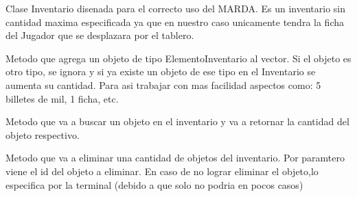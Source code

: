 \documentclass[letterpaper,10pt,english]{sphinxmanual}
\begin{document}
\begin{fulllineitems}
\label{\detokenize{codigo:inventario.Inventario}}
Clase Inventario disenada para el correcto uso del MARDA. Es un inventario sin cantidad maxima
especificada ya que en nuestro caso unicamente tendra la ficha del Jugador que se desplazara por
el tablero.

\begin{fulllineitems}
\label{\detokenize{codigo:inventario.Inventario.agregar}}
Metodo que agrega un objeto de tipo ElementoInventario al vector. Si el objeto es otro tipo, se ignora y
si ya existe un objeto de ese tipo en el Inventario se aumenta su cantidad. Para asi trabajar con mas facilidad
aspectos como: 5 billetes de mil, 1 ficha, etc.

\end{fulllineitems}


\begin{fulllineitems}
\label{\detokenize{codigo:inventario.Inventario.buscar_en_inventario}}
Metodo que va a buscar un objeto en el inventario y va a retornar la cantidad del objeto respectivo.

\end{fulllineitems}


\begin{fulllineitems}
\label{\detokenize{codigo:inventario.Inventario.eliminar}}
Metodo que va a eliminar una cantidad de objetos del inventario. Por paramtero viene el id del objeto
a eliminar. En caso de no lograr eliminar el objeto,lo especifica por la terminal (debido a que solo 
no podria en pocos casos)


\end{fulllineitems}
\end{fulllineitems}
\end{document}
